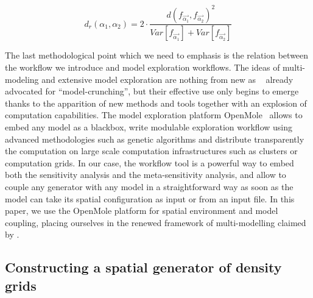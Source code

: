 \documentclass[Royal,sageh,times]{sagej}
\begin{document}
\begin{equation}\label{eq:phase-distance}
d_r\left(\alpha_1,\alpha_2\right) = 2 \cdot \frac{d(f_{\vec{\alpha_1}},f_{\vec{\alpha_2}})^2}{Var\left[f_{\vec{\alpha_1}}\right] + Var\left[f_{\vec{\alpha_2}}\right]}
\end{equation}



The last methodological point which we need to emphasis is the relation between the workflow we introduce and model exploration workflows. The ideas of multi-modeling and extensive model exploration are nothing from new as ~\cite{openshaw1983data} already advocated for ``model-crunching'', but their effective use only begins to emerge thanks to the apparition of new methods and tools together with an explosion of computation capabilities. The model exploration platform OpenMole~\citep{reuillon2013openmole} allows to embed any model as a blackbox, write modulable exploration workflow using advanced methodologies such as genetic algorithms and distribute transparently the computation on large scale computation infrastructures such as clusters or computation grids. In our case, the workflow tool is a powerful way to embed both the sensitivity analysis and the meta-sensitivity analysis, and allow to couple any generator with any model in a straightforward way as soon as the model can take its spatial configuration as input or from an input file. In this paper, we use the OpenMole platform for spatial environment and model coupling, placing ourselves in the renewed framework of multi-modelling claimed by \citet{cottineau2015modular}.
\subsection{Constructing a spatial generator of density grids}
\end{document}
